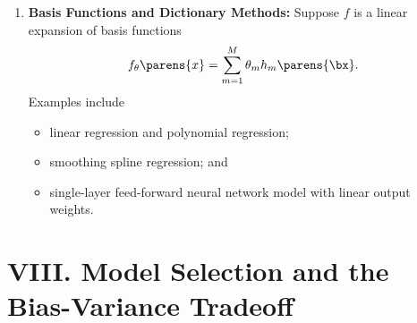 \documentclass[12pt]{article}
\begin{document}
\begin{enumerate}[label=\textbf{\arabic*.}]
	\item \textbf{Basis Functions and Dictionary Methods:} Suppose $f$ is a linear expansion of basis functions 
	\begin{align}
		f_{\theta} \parens{x} = \sum_{m=1}^M \theta_m h_m \parens{\bx}. 
	\end{align}
	Examples include 
	\begin{itemize}
		\item linear regression and polynomial regression; 
		\item smoothing spline regression; and 
		\item single-layer feed-forward neural network model with linear output weights. 
	\end{itemize}
\end{enumerate}


\section*{VIII. Model Selection and the Bias-Variance Tradeoff}
\end{document}
